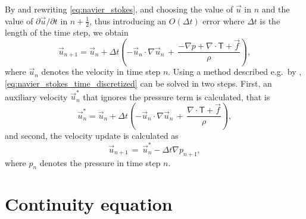 By  and rewriting \eqref{eq:navier_stokes}, and choosing the value of $\vec{u}$ in \timestep $n$ and the value of $\partial\vec{u}/\partial t$ in \timestep $n+\frac{1}{2}$, thus introducing an $O(\Delta t)$ error where $\Delta t$ is the length of the time step, we obtain
%
\begin{equation} \label{eq:navier_stokes_time_discretized}
\vec{u}_{n+1}  = \vec{u}_{n} + \Delta t\left(-\vec{u}_{n}\cdot\nabla\vec{u}_{n} \,+\, \frac{-\nabla p + \nabla\cdot\boldsymbol{\mathsf{T}} + \vec{f}}{\rho}\right),
\end{equation}
%
where $\vec{u}_{n}$ denotes the velocity in time step $n$. Using a method described e.g.\ by \citet{Losasso2004}, \eqref{eq:navier_stokes_time_discretized} can be solved in two steps. First, an auxiliary velocity $\vec{u}^*_n$ that ignores the pressure term is calculated, that is
%
\begin{equation} \label{eq:auxiliary_velocity}
\vec{u}^*_n  = \vec{u}_{n} + \Delta t\left(-\vec{u}_{n}\cdot\nabla\vec{u}_{n} \,+\, \frac{\nabla\cdot\boldsymbol{\mathsf{T}} + \vec{f}}{\rho}\right),
\end{equation}
%
and second, the velocity update is calculated as
%
\begin{equation} \label{eq:velocity_update}
\vec{u}_{n+1} \,=\, \vec{u}^*_n - \Delta t\nabla p_{n+1},
\end{equation}
%
where $p_n$ denotes the pressure in time step $n$.

\section{Continuity equation}

